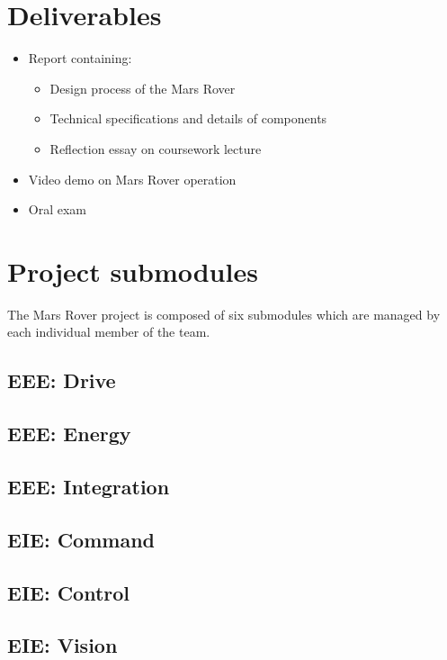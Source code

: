 \documentclass[10pt, a4paper]{article}
\begin{document}
\section{Deliverables}

\begin{itemize}
    \item Report containing:
    \begin{itemize}
        \item Design process of the Mars Rover 
        \item Technical specifications and details of components
        \item Reflection essay on coursework lecture 
    \end{itemize}
    \item Video demo on Mars Rover operation 
    \item Oral exam 
\end{itemize}

\section{Project submodules}

The Mars Rover project is composed of six submodules which are managed by each individual member of the team. 

\subsection{EEE: Drive}

\subsection{EEE: Energy}

\subsection{EEE: Integration}

\subsection{EIE: Command}

\subsection{EIE: Control}

\subsection{EIE: Vision}




 


\end{document}
